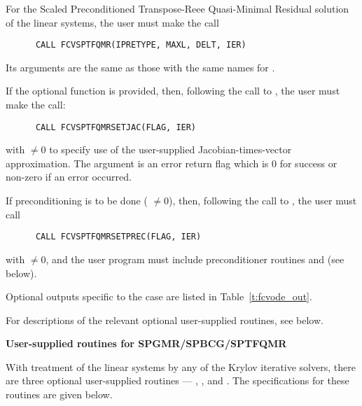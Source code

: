 \begin{Steps}
  For the Scaled Preconditioned Transpose-Reee Quasi-Minimal Residual solution 
  of the linear systems, the user must make the call
\begin{verbatim}
      CALL FCVSPTFQMR(IPRETYPE, MAXL, DELT, IER)
\end{verbatim}
  Its arguments are the same as those with the same names for .

  If the optional function  is provided, then, following the call to
  , the user must make the call:
\begin{verbatim}
      CALL FCVSPTFQMRSETJAC(FLAG, IER)
\end{verbatim}
  with  $\neq 0$ to specify use of the user-supplied
  Jacobian-times-vector approximation.
  The argument  is an error return flag which is $0$ 
  for success or non-zero if an error occurred.
  
  If preconditioning is to be done ( $\neq 0$), then, following the
  call to , the user must call
\begin{verbatim}
      CALL FCVSPTFQMRSETPREC(FLAG, IER)
\end{verbatim}
  with  $\neq 0$, and the user program must include preconditioner routines
   and  (see below).

  Optional outputs specific to the {\sptfqmr} case are listed in
  Table~\ref{t:fcvode_out}.

  For descriptions of the relevant optional user-supplied routines, see below.
  

 {\s}{\p} {\bf User-supplied routines for SPGMR/SPBCG/SPTFQMR}

  With treatment of the linear systems by any of the Krylov iterative
  solvers, there are three optional user-supplied routines ---
  , , and .  The specifications
  for these routines are given below.


\end{Steps}
